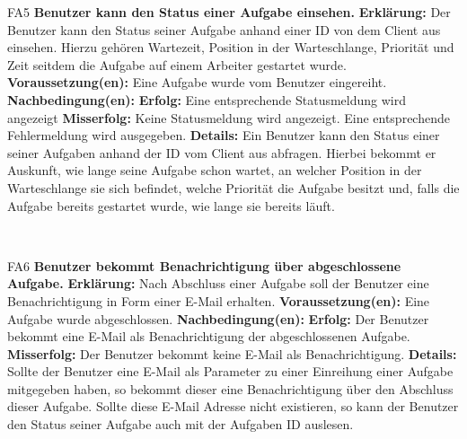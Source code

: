 \documentclass[a4paper,12pt]{article}
\begin{document}
\begin{itemize}[nosep]
	\begin{minipage}[t]{\linewidth}
		\item[FA5] \textbf{\gls{Benutzer} kann den Status einer Aufgabe einsehen.}
		\subitem \textbf{Erklärung:} Der \gls{Benutzer} kann den Status seiner Aufgabe anhand einer ID von dem Client aus einsehen. Hierzu gehören Wartezeit, Position in der Warteschlange, Priorität und Zeit seitdem die Aufgabe auf einem \gls{Arbeiter} gestartet wurde.
		\subitem \textbf{Voraussetzung(en):} Eine Aufgabe wurde vom \gls{Benutzer} eingereiht.
		\subitem \textbf{Nachbedingung(en):}
		\subsubitem \textbf{Erfolg:} Eine entsprechende Statusmeldung wird angezeigt
		\subsubitem \textbf{Misserfolg:} Keine Statusmeldung wird angezeigt. Eine entsprechende Fehlermeldung wird ausgegeben.
		\subitem \textbf{Details:} Ein \gls{Benutzer} kann den Status einer seiner Aufgaben anhand der ID vom \gls{Client} aus abfragen. Hierbei bekommt er Auskunft, wie lange seine Aufgabe schon wartet, an welcher Position in der \gls{Warteschlange} sie sich befindet, welche Priorität die Aufgabe besitzt und, falls die Aufgabe bereits gestartet wurde, wie lange sie bereits läuft.
	\end{minipage}
	\newline
	\\
	
	
	\begin{minipage}[t]{\linewidth}
		\item[FA6] \textbf{\gls{Benutzer} bekommt Benachrichtigung über abgeschlossene Aufgabe.}
		\subitem \textbf{Erklärung:} Nach Abschluss einer Aufgabe soll der \gls{Benutzer} eine Benachrichtigung in Form einer E-Mail erhalten.
		\subitem \textbf{Voraussetzung(en):} Eine Aufgabe wurde abgeschlossen.
		\subitem \textbf{Nachbedingung(en):}
		\subsubitem \textbf{Erfolg:} Der \gls{Benutzer} bekommt eine E-Mail als Benachrichtigung der abgeschlossenen Aufgabe.
		\subsubitem \textbf{Misserfolg:} Der \gls{Benutzer} bekommt keine E-Mail als Benachrichtigung.
		\subitem \textbf{Details:} Sollte der \gls{Benutzer} eine E-Mail als Parameter zu einer Einreihung einer Aufgabe mitgegeben haben, so bekommt dieser eine Benachrichtigung über den Abschluss dieser Aufgabe. Sollte diese E-Mail Adresse nicht existieren, so kann der Benutzer den Status seiner Aufgabe auch mit der Aufgaben ID auslesen.
    \end{minipage}	
	\newline
	\\
	

\end{itemize}
\end{document}
